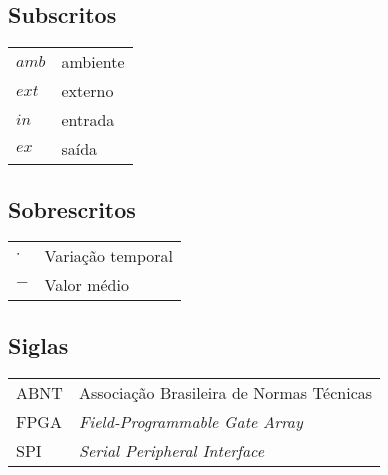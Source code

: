 \subsection*{Subscritos}

\begin{tabular}{p{}p{}}
$amb$	& ambiente \\
$ext$	& externo \\
$in$	& entrada \\
$ex$	& saída \\
\end{tabular}

\subsection*{Sobrescritos}

\begin{tabular}{p{}p{}}
$\cdot$	& Variação temporal \\
$-$	& Valor médio
\end{tabular}

\subsection*{Siglas}

\begin{tabular}{p{}p{}}
ABNT	& Associação Brasileira de Normas Técnicas\\
FPGA & \textit{Field-Programmable Gate Array}\\
SPI & \textit{Serial Peripheral Interface}\\
\end{tabular}


